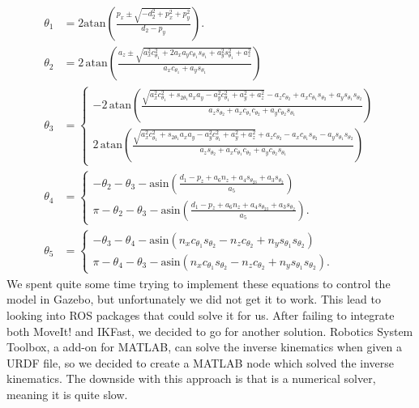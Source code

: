 \documentclass[11pt,a4paper, titlepage]{article}
\begin{document}
	\begin{align*}
\theta_1 &= 2\mathrm{atan}\left(\frac{p_x \pm \sqrt{-d_2^2 + p_x^2 +p_y^2}}{d_2 - p_y}\right). \\[10pt]
\theta_2 &= 2\,\mathrm{atan}\left(\frac{a_z \pm \sqrt{a_x^2c_{\theta_1}^2+2a_xa_yc_{\theta_1}s_{\theta_1}+a_y^2s_{\theta_1}^2+a_z^2}}{a_xc_{\theta_1} + a_ys_{\theta_1}}\right) \\[10pt]
\theta_3 &= 
\begin{cases}
-2\,\mathrm{atan}\left(\frac{\sqrt{a_x^2c_{\theta_1}^2 + s_{2\theta_1}a_xa_y-a_y^2c_{\theta_1}^2 + a_y^2 + a_z^2} - a_zc_{\theta_2}+a_xc_{\theta_1}s_{\theta_2}+a_ys_{\theta_1}s_{\theta_2}}{a_zs_{\theta_2} + a_xc_{\theta_1}c_{\theta_2} + a_yc_{\theta_2}s_{\theta_1}}\right) \\[10pt]
2\,\mathrm{atan}\left(\frac{\sqrt{a_x^2c_{\theta_1}^2 + s_{2\theta_1}a_xa_y-a_y^2c_{\theta_1}^2 + a_y^2 + a_z^2} + a_zc_{\theta_2} - a_xc_{\theta_1}s_{\theta_2} - a_ys_{\theta_1}s_{\theta_2}}{a_zs_{\theta_2} + a_xc_{\theta_1}c_{\theta_2} + a_yc_{\theta_2}s_{\theta_1}}\right)
\end{cases} \\[10pt]
\theta_4 &= \begin{cases}
-\theta_2 - \theta_3 - \mathrm{asin}\left(\frac{d_1 - p_z + a_6n_z + a_4s_{\theta_{23}} + a_3s_{\theta_2}}{a_5}\right) \\[5pt]
\pi -\theta_2 - \theta_3 - \mathrm{asin}\left(\frac{d_1 - p_z + a_6n_z + a_4s_{\theta_{23}} + a_3s_{\theta_2}}{a_5}\right).
\end{cases} \\[10pt]
\theta_5 &= 
\begin{cases}
-\theta_3 - \theta_4 - \mathrm{asin}(n_xc_{\theta_1}s_{\theta_2} - n_zc_{\theta_2} + n_ys_{\theta_1}s_{\theta_2}) \\[5pt]
\pi - \theta_4 - \theta_3 - \mathrm{asin}(n_xc_{\theta_1}s_{\theta_2} - n_zc_{\theta_2} + n_ys_{\theta_1}s_{\theta_2}).
\end{cases}
\end{align*}
\newpage
We spent quite some time trying to implement these equations to control the model in Gazebo, but unfortunately we did not get it to work. This lead to looking into ROS packages that could solve it for us. After failing to integrate both MoveIt! and  IKFast, we decided to go for another solution. Robotics System Toolbox, a add-on for MATLAB, can solve the inverse kinematics when given a URDF file, so we decided to create a MATLAB node which solved the inverse kinematics. The downside with this approach is that is a numerical solver, meaning it is quite slow.
\end{document}
